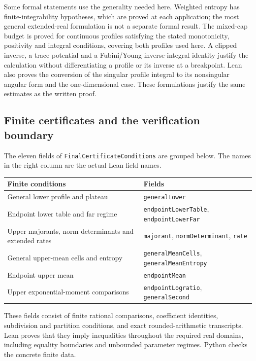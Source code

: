 \documentclass[11pt,a4paper]{article}
\numberwithin{equation}{section}
\begin{document}
Some formal statements use the generality needed here. Weighted entropy has
finite-integrability hypotheses, which are proved at each application;
the most general extended-real formulation is not a separate formal result.
The mixed-cap budget is proved for continuous profiles satisfying the stated
monotonicity, positivity and integral conditions, covering both profiles used
here. A clipped inverse, a trace potential and a Fubini/Young inverse-integral
identity justify the calculation without differentiating a profile or its
inverse at a breakpoint. Lean also proves the conversion of the singular
profile integral to its nonsingular angular form and the one-dimensional
case. These formulations justify the same estimates as the written proof.

\subsection{Finite certificates and the verification boundary}
\label{app:lean-certificates}

The eleven fields of \texttt{FinalCertificateConditions} are grouped below.
The names in the right column are the actual Lean field names.
\begin{center}
\small
\begin{tabular}{@{}p{}p{}@{}}
\hline
Finite conditions & Fields\\
\hline
General lower profile and plateau &
\texttt{generalLower}\\
Endpoint lower table and far regime &
\texttt{endpointLowerTable}, \texttt{endpointLowerFar}\\
Upper majorants, norm determinants and extended rates &
\texttt{majorant}, \texttt{normDeterminant}, \texttt{rate}\\
General upper-mean cells and entropy &
\texttt{generalMeanCells}, \texttt{generalMeanEntropy}\\
Endpoint upper mean & \texttt{endpointMean}\\
Upper exponential-moment comparisons &
\texttt{endpointLogratio}, \texttt{generalSecond}\\
\hline
\end{tabular}
\end{center}
These fields consist of finite rational comparisons, coefficient identities,
subdivision and partition conditions, and exact rounded-arithmetic transcripts.
Lean proves that they imply inequalities throughout the required real domains,
including equality boundaries and unbounded parameter regimes. Python checks
the concrete finite data.
\end{document}
